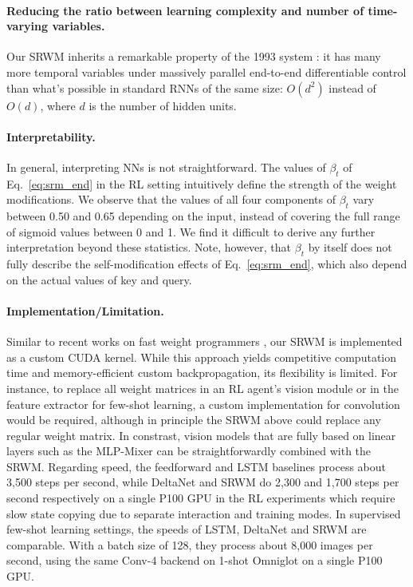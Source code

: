 \documentclass[nohyperref]{article}
\theoremstyle{plain}
\theoremstyle{definition}
\theoremstyle{remark}
\begin{document}
\paragraph{Reducing the ratio between learning complexity and number of time-varying variables.}
Our SRWM inherits a remarkable property of the 1993 system \citep{schmidhuber1993reducing}: it has many more temporal variables under massively parallel end-to-end differentiable control than what's possible in standard RNNs of the same size: $O(d^2)$ instead of $O(d)$, where $d$ is the number of hidden units.

\paragraph{Interpretability.}
In general, interpreting NNs is not straightforward.
The values of $\beta_t$ of Eq.~\ref{eq:srm_end} in the RL setting intuitively define the strength
of the weight modifications.
We observe that the values of all four components of $\beta_t$ vary between 0.50 and 0.65 depending on the input, instead of covering the full range of sigmoid values between 0 and 1.
We find it difficult to derive any further interpretation beyond these statistics.
Note, however, that $\beta_t$ by itself does not fully describe the self-modification effects of Eq.~\ref{eq:srm_end},
which also depend on the actual values of key and query.

\paragraph{Implementation/Limitation.}
Similar to recent works on fast weight programmers \citep{schlag2021linear, katharopoulos2020transformers, irie2021going},
our SRWM is implemented as a custom CUDA kernel.
While this approach yields competitive computation time and memory-efficient custom backpropagation, its flexibility is limited.
For instance, to replace all weight matrices in an RL agent's vision module or in the feature extractor for few-shot learning,
a custom implementation for convolution would be required,
although in principle the SRWM above could replace any
regular weight matrix.
In constrast, vision models that are fully based on linear layers such as the MLP-Mixer \citep{tolstikhin2021mlp} can be straightforwardly combined with the SRWM.
Regarding speed, the feedforward and LSTM baselines process about 3,500 steps per second,
while DeltaNet and SRWM do 2,300 and 1,700 steps per second respectively on a single P100 GPU in the RL experiments which require slow state copying due to separate interaction and training modes.
In supervised few-shot learning settings,
the speeds of LSTM, DeltaNet and SRWM
are comparable.
With a batch size of 128, they process about 8,000 images per second, using the same Conv-4 backend on 1-shot Omniglot on a single P100 GPU.
\end{document}
